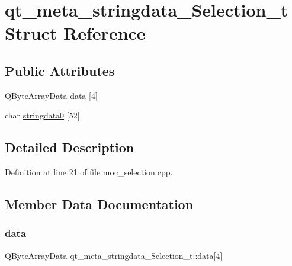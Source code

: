 \hypertarget{structqt__meta__stringdata___selection__t}{}\section{qt\+\_\+meta\+\_\+stringdata\+\_\+\+Selection\+\_\+t Struct Reference}
\label{structqt__meta__stringdata___selection__t}
\subsection*{Public Attributes}
\begin{DoxyCompactItemize}
\item 
Q\+Byte\+Array\+Data \mbox{\hyperlink{structqt__meta__stringdata___selection__t_a3b7edbd763601e3e3e6b7decd12dc4b5}{data}} \mbox{[}4\mbox{]}
\item 
char \mbox{\hyperlink{structqt__meta__stringdata___selection__t_ad1deaf48ab445e4da2aa3ad2b77d845f}{stringdata0}} \mbox{[}52\mbox{]}
\end{DoxyCompactItemize}


\subsection{Detailed Description}


Definition at line 21 of file moc\+\_\+selection.\+cpp.



\subsection{Member Data Documentation}
\mbox{\label{structqt__meta__stringdata___selection__t_a3b7edbd763601e3e3e6b7decd12dc4b5}} 
\subsubsection{\texorpdfstring{data}{data}}
{\footnotesize\ttfamily Q\+Byte\+Array\+Data qt\+\_\+meta\+\_\+stringdata\+\_\+\+Selection\+\_\+t\+::data\mbox{[}4\mbox{]}}



